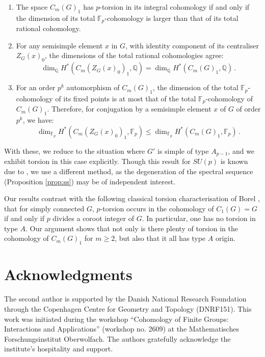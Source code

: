 \documentclass[oneside, 12pt, a4paper]{amsart}
\numberwithin{equation}{section}
\newcommand{\F}{\mathbb{F}}
\newcommand{\Q}{\mathbb{Q}}
\theoremstyle{plain}
\theoremstyle{definition}
\theoremstyle{remark}
\begin{document}
\begin{enumerate}
    \item The space $C_m(G)_1$ has $p$-torsion in its integral cohomology if and only if the dimension of its total $\F_p$-cohomology is larger than that of its total rational cohomology.
    \item For any semisimple element $x$ in $G$, with identity component of its centraliser $Z_G(x)_0$, the dimensions of the total rational cohomologies agree:
    \[\dim_\Q H^*(C_m(Z_G(x)_0)_1,\Q)=\dim_\Q H^*(C_m(G)_1,\Q)\, .\]
    
    \item For an order $p^k$ automorphism of $C_m(G)_1$, the dimension of the total $\F_p$-cohomology of its fixed points is at most that of the total $\F_p$-cohomology of $C_m(G)_1$. Therefore, for conjugation by a semisimple element $x$ of $G$ of order $p^k$, we have: 
    \[\dim_{\F_p}H^*(C_m(Z_G(x)_0)_1,\F_p)\leq \dim_{\F_p} H^*(C_m(G)_1,\F_p)\, .\]
\end{enumerate}

With these, we reduce to the situation where $G'$ is simple of type $A_{p-1}$, and we exhibit torsion in this case explicitly. Though this result for $SU(p)$ is known due to \cite{KishimotoTakeda1}, we use a different method, as the degeneration of the spectral sequence (Proposition \ref{prop:ss}) may be of independent interest.

Our results contrast with the following classical torsion characterisation of Borel \cite{Borel}, that for simply connected $G$, $p$-torsion occurs in the cohomology of $C_1(G)=G$ if and only if $p$ divides a coroot integer of $G$. In particular, one has no torsion in type $A$. Our argument shows that not only is there plenty of torsion in the cohomology of $C_m(G)_1$ for $m\geq 2$, but also that it all has type $A$ origin. 

\section*{Acknowledgments}

The second author is supported by the Danish National Research Foundation through the Copenhagen Centre for Geometry and Topology (DNRF151). This work was initiated during the workshop ``Cohomology of Finite Groups: Interactions and Applications'' (workshop no. 2609) at the Mathematisches Forschungsinstitut Oberwolfach. The authors gratefully acknowledge the institute's hospitality and support.
\end{document}
